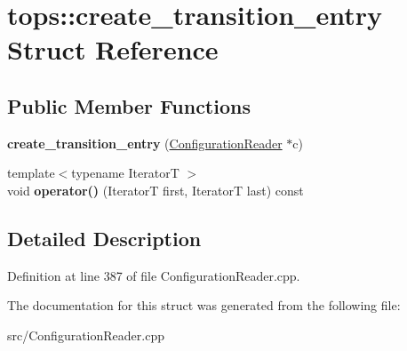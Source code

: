 \hypertarget{structtops_1_1create__transition__entry}{}\section{tops\+:\+:create\+\_\+transition\+\_\+entry Struct Reference}
\label{structtops_1_1create__transition__entry}
\subsection*{Public Member Functions}
\begin{DoxyCompactItemize}
\item 
\mbox{\label{structtops_1_1create__transition__entry_a4cc101102444c43c6e8b5ea36b6bab4d}} 
{\bfseries create\+\_\+transition\+\_\+entry} (\hyperlink{classtops_1_1ConfigurationReader}{Configuration\+Reader} $\ast$c)
\item 
\mbox{\label{structtops_1_1create__transition__entry_a0aa023a5b0d244856f13a7e902fe5130}} 
{\footnotesize template$<$typename IteratorT $>$ }\\void {\bfseries operator()} (IteratorT first, IteratorT last) const
\end{DoxyCompactItemize}


\subsection{Detailed Description}


Definition at line 387 of file Configuration\+Reader.\+cpp.



The documentation for this struct was generated from the following file\+:\begin{DoxyCompactItemize}
\item 
src/Configuration\+Reader.\+cpp\end{DoxyCompactItemize}
